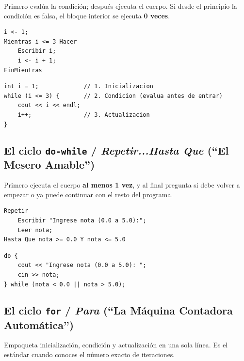 \documentclass[11pt,letterpaper]{article}
\begin{document}
Primero evalúa la condición; después ejecuta el cuerpo. Si desde el principio la condición es falsa, el bloque interior se ejecuta \textbf{0 veces}.

\begin{lstlisting}[style=pseintmonitoria,caption={Sintaxis del ciclo Mientras en PSeInt}]
i <- 1;
Mientras i <= 3 Hacer
    Escribir i;
    i <- i + 1;
FinMientras
\end{lstlisting}

\begin{lstlisting}[style=cppmonitoria,caption={Sintaxis equivalente del ciclo while en C++}]
int i = 1;             // 1. Inicializacion
while (i <= 3) {       // 2. Condicion (evalua antes de entrar)
    cout << i << endl;
    i++;               // 3. Actualizacion
}
\end{lstlisting}

\subsection{\texorpdfstring{El ciclo \texttt{do-while} / \textit{Repetir...Hasta Que} (``El Mesero Amable'')}{El ciclo do-while / Repetir...Hasta Que}}

Primero ejecuta el cuerpo \textbf{al menos 1 vez}, y al final pregunta si debe volver a empezar o ya puede continuar con el resto del programa.

\begin{lstlisting}[style=pseintmonitoria,caption={Sintaxis de Repetir...Hasta Que en PSeInt (condición de SALIDA)}]
Repetir
    Escribir "Ingrese nota (0.0 a 5.0):";
    Leer nota;
Hasta Que nota >= 0.0 Y nota <= 5.0
\end{lstlisting}

\begin{lstlisting}[style=cppmonitoria,caption={Sintaxis de do-while en C++ (condición de CONTINUACIÓN + punto y coma final)}]
do {
    cout << "Ingrese nota (0.0 a 5.0): ";
    cin >> nota;
} while (nota < 0.0 || nota > 5.0);
\end{lstlisting}

\subsection{\texorpdfstring{El ciclo \texttt{for} / \textit{Para} (``La Máquina Contadora Automática'')}{El ciclo for / Para}}

Empaqueta inicialización, condición y actualización en una sola línea. Es el estándar cuando conoces el número exacto de iteraciones.
\end{document}
